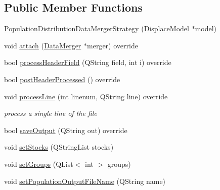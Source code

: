 \subsection*{Public Member Functions}
\begin{DoxyCompactItemize}
\item 
\mbox{\hyperlink{classdisplace_1_1workers_1_1_population_distribution_data_merger_strategy_a4351887c2f02288ce8d6ac878e96256b}{Population\+Distribution\+Data\+Merger\+Strategy}} (\mbox{\hyperlink{class_displace_model}{Displace\+Model}} $\ast$model)
\item 
void \mbox{\hyperlink{classdisplace_1_1workers_1_1_population_distribution_data_merger_strategy_a91d2c393f913bed2f4b276fbddb2c4c8}{attach}} (\mbox{\hyperlink{classdisplace_1_1workers_1_1_data_merger}{Data\+Merger}} $\ast$merger) override
\item 
bool \mbox{\hyperlink{classdisplace_1_1workers_1_1_population_distribution_data_merger_strategy_a6ffc92cb6a4864e061f22212d3a4ee23}{process\+Header\+Field}} (Q\+String field, int i) override
\item 
bool \mbox{\hyperlink{classdisplace_1_1workers_1_1_population_distribution_data_merger_strategy_a9b777133a622972bb5d8008753b3b6df}{post\+Header\+Processed}} () override
\item 
void \mbox{\hyperlink{classdisplace_1_1workers_1_1_population_distribution_data_merger_strategy_af69e684d518d2a441c726eb7d8a21501}{process\+Line}} (int linenum, Q\+String line) override
\begin{DoxyCompactList}\small\item\em process a single line of the file \end{DoxyCompactList}\item 
bool \mbox{\hyperlink{classdisplace_1_1workers_1_1_population_distribution_data_merger_strategy_a5fb32f900e449b7740b3ce4618b068c9}{save\+Output}} (Q\+String out) override
\item 
void \mbox{\hyperlink{classdisplace_1_1workers_1_1_population_distribution_data_merger_strategy_a9f379a5cbb42faa0feacdffb6cf3fb4c}{set\+Stocks}} (Q\+String\+List stocks)
\item 
void \mbox{\hyperlink{classdisplace_1_1workers_1_1_population_distribution_data_merger_strategy_a32215a2cff2db50cc1823d75da6ecba7}{set\+Groups}} (Q\+List$<$ int $>$ groups)
\item 
void \mbox{\hyperlink{classdisplace_1_1workers_1_1_population_distribution_data_merger_strategy_acfacb6d8cc4e2c51a005ccc77b417ab5}{set\+Population\+Output\+File\+Name}} (Q\+String name)
\end{DoxyCompactItemize}
